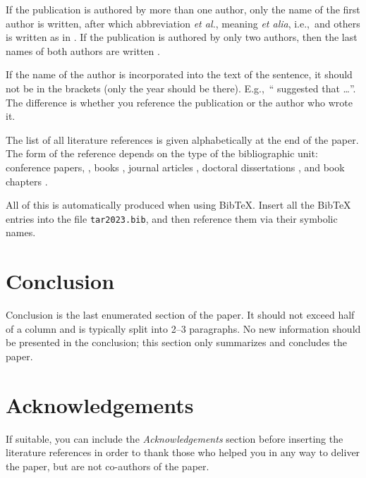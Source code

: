 \documentclass[10pt, a4paper]{article}
\begin{document}
If the publication is authored by more than one author, only the name of the first author is written, after which abbreviation \emph{et al.}, meaning \emph{et alia}, i.e.,~and others is written as in \citep{johnson-etc}. If the publication is authored by only two authors, then the last names of both authors are written \citep{johnson-howells}.

If the name of the author is incorporated into the text of the sentence, it should not be in the brackets (only the year should be there). E.g.,~``\citet{chomsky-73}
suggested that \dots''. The difference is whether you reference the publication or the author who wrote it. 

The list of all literature references is given alphabetically at the end of the paper. The form of the reference depends on the type of the bibliographic unit: conference papers,
\citep{chave-64}, books \citep{butcher-81}, journal articles
\citep{howells-51}, doctoral dissertations \citep{croft-78}, and book chapters \citep{feigl-58}. 

All of this is automatically produced when using BibTeX. Insert all the BibTeX entries into the file \texttt{tar2023.bib}, and then reference them via their symbolic names.

\section{Conclusion}

Conclusion is the last enumerated section of the paper. It should not exceed half of a column and is typically split into 2--3 paragraphs. No new information should be presented in the conclusion; this section only summarizes and concludes the paper.

\section*{Acknowledgements}

If suitable, you can include the \textit{Acknowledgements} section before inserting the literature references  in order to thank those who helped you in any way to deliver the paper, but are not co-authors of the paper.


 
\end{document}
